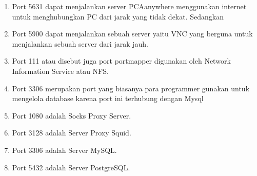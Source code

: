 \documentclass[12pt,a4paper]{article}
\begin{document}
\begin{enumerate}
\item Port 5631 dapat menjalankan server PCAanywhere menggunakan internet untuk menghubungkan PC dari jarak yang tidak dekat.
Sedangkan 
\item Port 5900 dapat menjalankan sebuah server yaitu VNC yang berguna untuk menjalankan sebuah server dari jarak jauh.
\item Port 111 atau disebut juga port portmapper digunakan oleh Network Information Service atau NFS.
\item Port 3306 merupakan port yang biasanya para programmer gunakan untuk mengelola database karena port ini terhubung dengan Mysql
\item Port 1080 adalah Socks Proxy Server.
\item Port 3128 adalah Server Proxy Squid.
\item Port 3306 adalah Server MySQL.
\item Port 5432 adalah Server PostgreSQL.
\end{enumerate}
\end{document}
